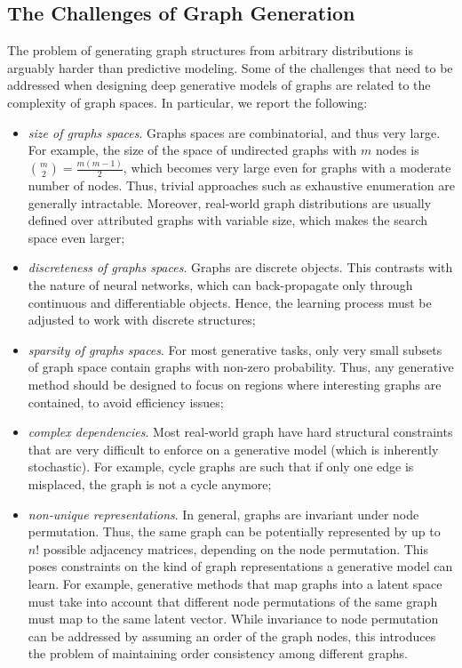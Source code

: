 \subsection{The Challenges of Graph Generation}
The problem of generating graph structures from arbitrary distributions is arguably harder than predictive modeling. Some of the challenges that need to be addressed when designing deep generative models of graphs are related to the complexity of graph spaces. In particular, we report the following:
\begin{itemize}
    \item \emph{size of graphs spaces}. Graphs spaces are combinatorial, and thus very large. For example, the size of the space of undirected graphs with $m$ nodes is ${m \choose 2} = \frac{m(m-1)}{2}$, which becomes very large even for graphs with a moderate number of nodes. Thus, trivial approaches such as exhaustive enumeration are generally intractable. Moreover, real-world graph distributions are usually defined over attributed graphs with variable size, which makes the search space even larger;
    \item \emph{discreteness of graphs spaces}. Graphs are discrete objects. This contrasts with the nature of neural networks, which can back-propagate only through continuous and differentiable objects. Hence, the learning process must be adjusted to work with discrete structures;
    \item \emph{sparsity of graphs spaces}. For most generative tasks, only very small subsets of graph space contain graphs with non-zero probability. Thus, any generative method should be designed to focus on regions where interesting graphs are contained, to avoid efficiency issues;
    \item \emph{complex dependencies}. Most real-world graph have hard structural constraints that are very difficult to enforce on a generative model (which is inherently stochastic). For example, cycle graphs are such that if only one edge is misplaced, the graph is not a cycle anymore;
    \item \emph{non-unique representations}. In general, graphs are invariant under node permutation. Thus, the same graph can be potentially represented by up to $n!$ possible adjacency matrices, depending on the node permutation. This poses constraints on the kind of graph representations a generative model can learn. For example, generative methods that map graphs into a latent space must take into account that different node permutations of the same graph must map to the same latent vector. While invariance to node permutation can be addressed by assuming an order of the graph nodes, this introduces the problem of maintaining order consistency among different graphs.
\end{itemize}


